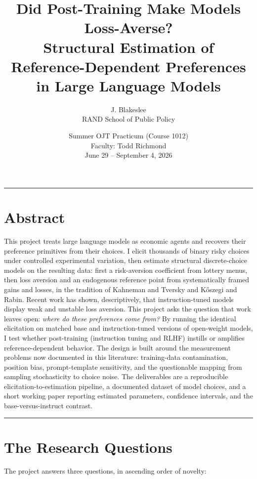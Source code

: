 \documentclass[11pt]{article}
\title{\vspace{-1.5em}\textbf{Did Post-Training Make Models Loss-Averse?}\\[0.3em]
\large Structural Estimation of Reference-Dependent Preferences in Large Language Models}
\author{J. Blakeslee \\ \small RAND School of Public Policy}
\date{\small Summer OJT Practicum (Course 1012) \\ \small Faculty: Todd Richmond \\ \small June 29 -- September 4, 2026}
\begin{document}
\maketitle

\hrule
\vspace{0.5em}

\section*{Abstract}
\noindent
This project treats large language models as economic agents and recovers their preference
primitives from their choices. I elicit thousands of binary risky choices under controlled
experimental variation, then estimate structural discrete-choice models on the resulting data:
first a risk-aversion coefficient from lottery menus, then loss aversion and an endogenous
reference point from systematically framed gains and losses, in the tradition of Kahneman and
Tversky and K\H{o}szegi and Rabin. Recent work has shown, descriptively, that instruction-tuned
models display weak and unstable loss aversion. This project asks the question that work leaves
open: \emph{where do these preferences come from?} By running the identical elicitation on
matched base and instruction-tuned versions of open-weight models, I test whether post-training
(instruction tuning and RLHF) instills or amplifies reference-dependent behavior. The design is
built around the measurement problems now documented in this literature: training-data
contamination, position bias, prompt-template sensitivity, and the questionable mapping from
sampling stochasticity to choice noise. The deliverables are a reproducible elicitation-to-estimation
pipeline, a documented dataset of model choices, and a short working paper reporting estimated
parameters, confidence intervals, and the base-versus-instruct contrast.

\vspace{0.5em}
\hrule
\vspace{0.8em}

\section{The Research Questions}

The project answers three questions, in ascending order of novelty:
\end{document}
